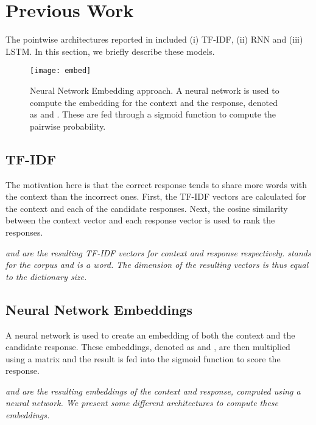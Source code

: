 \documentclass{article} \usepackage{nips15submit_e,times}
\newcommand{\MARTINSECOND}[1]{{\color{black}#1}} \newcommand{\MARTINTHIRD}[1]{{\color{black}#1}} \newcommand{\COPY}[1]{{\color{black}[#1]}}
\begin{document}
\MARTINSECOND
{
\section{Previous Work}




The pointwise architectures reported in \cite{lowe2015ubuntu} included (i) TF-IDF, (ii) RNN and (iii) LSTM.
In this section, we briefly describe these models. 

\begin{figure}[h!]
  \centering
  \texttt{[image: embed]}
  \caption   
  {
  Neural Network Embedding approach. 
  A neural network is used to compute the embedding for the context and the response, denoted as  and .
  These are fed through a sigmoid function to compute the pairwise probability.
  }
  \label{fig-prevwork}
\end{figure}

\subsection{TF-IDF}
The motivation here is that the correct response tends to share more words with the context than the incorrect ones.
First, the TF-IDF vectors are calculated for the context and each of the candidate responses.
Next, the cosine similarity between the context vector and each response vector is used to rank the responses.






\begingroup\vspace*{-\baselineskip}
{
    \emph{
     and  are the resulting TF-IDF vectors for context and response respectively.
     stands for the corpus and  is a word.
    The dimension of the resulting vectors is thus equal to the dictionary size.
    }
}
\vspace*{\baselineskip}\endgroup

\subsection{Neural Network Embeddings}
A neural network is used to create an embedding of both the context and the candidate response.
These embeddings, denoted as  and , are then multiplied using a matrix  and the result is fed into the sigmoid function
to score the response.






\begingroup\vspace*{-\baselineskip}
{
    \emph{
     and  are the resulting embeddings of the context and response, computed using a neural network.
    We present some different architectures to compute these embeddings.
    }
}
\vspace*{\baselineskip}\endgroup



}
\end{document}
